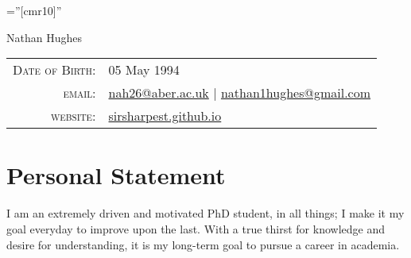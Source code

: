 \documentclass[a4paper,10pt]{article}
\begin{document}
\pagestyle{empty} %

\font\fb=''[cmr10]'' %

\par{\centering
  {\Huge Nathan {Hughes}
  }\bigskip\par}


\begin{center}
  \begin{tabular}{rl}
    \textsc{Date of Birth:} & 05                May 1994 \\
    \textsc{email:}     & \href{mailto:nah26@aber.ac.uk}{nah26@aber.ac.uk} | \href{mailto:nathan1hughes@gmail.com}{nathan1hughes@gmail.com} \\
    \textsc{website:}  & \href{sirsharpest.github.io}{sirsharpest.github.io}
  \end{tabular}
\end{center}


\section{Personal Statement}
I am an extremely driven and motivated PhD student, in all things; I make it my goal everyday to improve upon the last. With a true thirst for knowledge and desire for understanding, it is my long-term goal to pursue a career in academia.
\end{document}
